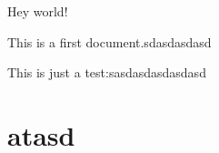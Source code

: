 \documentclass{article}
\begin{document}
Hey world!

This is a first document.sdasdasdasd

This is just a test:sasdasdasdasdasd

\section{atasd}
\end{document}
